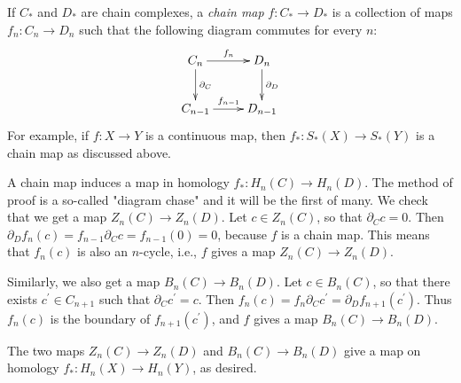If $C_\ast$ and $D_\ast$ are chain complexes, a \emph{chain map} $f\colon C_\ast\to D_\ast$ is a collection of maps $f_n\colon C_n\to D_n$ such that the following diagram commutes for every $n$:
\begin{equation*}
    \xymatrix{
	C_n\ar[r]^{f_n}\ar[d]^{\partial_C} & D_n\ar[d]^{\partial_D}\\
	C_{n-1}\ar[r]^{f_{n-1}} & D_{n-1}
    }
\end{equation*}
For example, if $f\colon X\to Y$ is a continuous map, then $f_\ast \colon S_\ast(X)\to S_\ast(Y)$ is a chain map as discussed above.

A chain map induces a map in homology $f_\ast: H_n(C)\to H_n(D)$. The method of proof is a so-called "diagram chase" and it will be the first of many. We check that we get a map $Z_n(C)\to Z_n(D)$. Let $c\in Z_n(C)$, so that $\partial_C c = 0$. Then $\partial_D f_n(c) = f_{n-1}\partial_C c = f_{n-1}(0) = 0$, because $f$ is a chain map. This means that $f_n(c)$ is also an $n$-cycle, i.e., $f$ gives a map $Z_n(C)\to Z_n(D)$.

Similarly, we also get a map $B_n(C)\to B_n(D)$. Let $c\in B_n(C)$, so that there exists $c^\prime \in C_{n+1}$ such that $\partial_C c^\prime = c$. Then $f_n(c) = f_n\partial_C c^\prime = \partial_D f_{n+1}(c^\prime)$. Thus $f_n(c)$ is the boundary of $f_{n+1}(c^\prime)$, and $f$ gives a map $B_n(C)\to B_n(D)$.

The two maps $Z_n(C)\to Z_n(D)$ and $B_n(C)\to B_n(D)$ give a map on homology $f_\ast: H_n(X)\to H_n(Y)$, as desired.